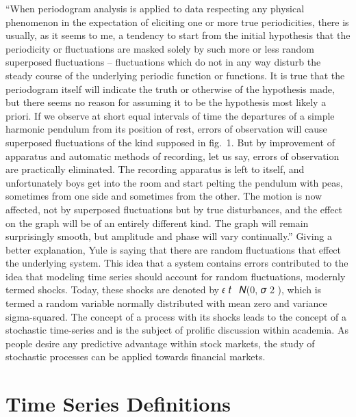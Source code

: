 \documentclass[../main.tex]{subfiles}
\begin{document}
    “When periodogram analysis is applied to data respecting any physical phenomenon in the expectation of eliciting one or more true periodicities, there is usually, as it seems to me, a tendency to start from the initial hypothesis that the periodicity or fluctuations are masked solely by such more or less random superposed fluctuations – fluctuations which do not in any way disturb the steady course of the underlying periodic function or functions.
    It is true that the periodogram itself will indicate the truth or otherwise of the hypothesis made, but there seems no reason for assuming it to be the hypothesis most likely a priori.
    If we observe at short equal intervals of time the departures of a simple harmonic pendulum from its position of rest, errors of observation will cause superposed fluctuations of the kind supposed in fig.\ 1.
    But by improvement of apparatus and automatic methods of recording, let us say, errors of observation are practically eliminated.
    The recording apparatus is left to itself, and unfortunately boys get into the room and start pelting the pendulum with peas, sometimes from one side and sometimes from the other.
    The motion is now affected, not by superposed fluctuations but by true disturbances, and the effect on the graph will be of an entirely different kind.
    The graph will remain surprisingly smooth, but amplitude and phase will vary continually.” %
    Giving a better explanation, Yule is saying that there are random fluctuations that effect the underlying system.
    This idea that a system contains errors contributed to the idea that modeling time series should account for random fluctuations, modernly termed shocks.
    Today, these shocks are denoted by 𝜖 𝑡 ~𝑁(0, 𝜎 2 ), which is termed a random variable normally distributed with mean zero and variance sigma-squared.
    The concept of a process with its shocks leads to the concept of a stochastic time-series and is the subject of prolific discussion within academia.
    As people desire any predictive advantage within stock markets, the study of stochastic processes can be applied towards financial markets.

    \section{Time Series Definitions}\label{sec:time-series-definitions}

\end{document}
